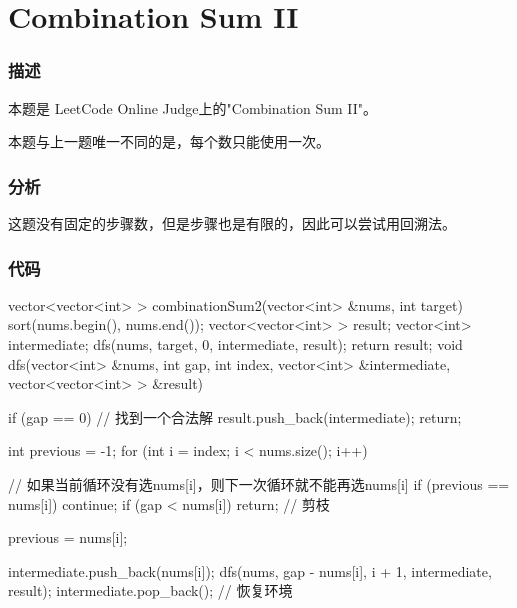 \section{Combination Sum II} %

\subsubsection{描述}
本题是 LeetCode Online Judge上的"Combination Sum II"。

本题与上一题唯一不同的是，每个数只能使用一次。

\subsubsection{分析}
这题没有固定的步骤数，但是步骤也是有限的，因此可以尝试用回溯法。

\subsubsection{代码}
\begin{Codex}[label=combination_sum2.cpp]
    vector<vector<int> > combinationSum2(vector<int> &nums, int target) {
        sort(nums.begin(), nums.end());
        vector<vector<int> > result;
        vector<int> intermediate;
        dfs(nums, target, 0, intermediate, result);
        return result;
    }
    void dfs(vector<int> &nums, int gap, int index,
            vector<int> &intermediate, vector<vector<int> > &result) {
        if (gap == 0) {  //  找到一个合法解
            result.push_back(intermediate);
            return;
        }

        int previous = -1;
        for (int i = index; i < nums.size(); i++) {
            // 如果当前循环没有选nums[i]，则下一次循环就不能再选nums[i]
            if (previous == nums[i])
                continue;
            if (gap < nums[i]) return;  // 剪枝

            previous = nums[i];

            intermediate.push_back(nums[i]);
            dfs(nums, gap - nums[i], i + 1, intermediate, result);
            intermediate.pop_back();  // 恢复环境
        }
    }
\end{Codex}
